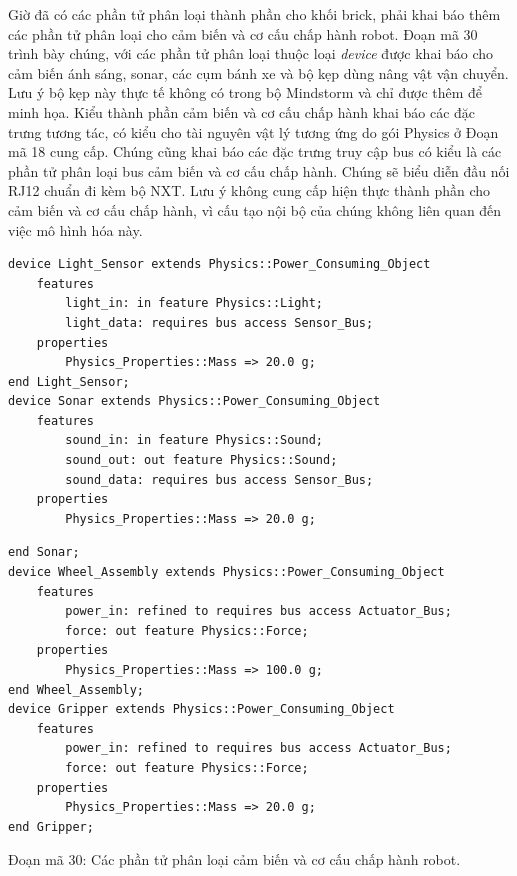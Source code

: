 Giờ đã có các phần tử phân loại thành phần cho khối brick, phải khai báo thêm các phần tử phân loại cho cảm biến và cơ cấu chấp hành robot. Đoạn mã 30 trình bày chúng, với các phần tử phân loại thuộc loại \emph{device} được khai báo cho cảm biến ánh sáng, sonar, các cụm bánh xe và bộ kẹp dùng nâng vật vận chuyển. Lưu ý bộ kẹp này thực tế không có trong bộ Mindstorm và chỉ được thêm để minh họa. Kiểu thành phần cảm biến và cơ cấu chấp hành khai báo các đặc trưng tương tác, có kiểu cho tài nguyên vật lý tương ứng do gói Physics ở Đoạn mã 18 cung cấp. Chúng cũng khai báo các đặc trưng truy cập bus có kiểu là các phần tử phân loại bus cảm biến và cơ cấu chấp hành. Chúng sẽ biểu diễn đầu nối RJ12 chuẩn đi kèm bộ NXT. Lưu ý không cung cấp hiện thực thành phần cho cảm biến và cơ cấu chấp hành, vì cấu tạo nội bộ của chúng không liên quan đến việc mô hình hóa này.
\begin{verbatim}
device Light_Sensor extends Physics::Power_Consuming_Object
    features
        light_in: in feature Physics::Light;
        light_data: requires bus access Sensor_Bus;
    properties
        Physics_Properties::Mass => 20.0 g;
end Light_Sensor;
device Sonar extends Physics::Power_Consuming_Object
    features
        sound_in: in feature Physics::Sound;
        sound_out: out feature Physics::Sound;
        sound_data: requires bus access Sensor_Bus;
    properties
        Physics_Properties::Mass => 20.0 g;
\end{verbatim}
\begin{verbatim}
end Sonar;
device Wheel_Assembly extends Physics::Power_Consuming_Object
    features
        power_in: refined to requires bus access Actuator_Bus;
        force: out feature Physics::Force;
    properties
        Physics_Properties::Mass => 100.0 g;
end Wheel_Assembly;
device Gripper extends Physics::Power_Consuming_Object
    features
        power_in: refined to requires bus access Actuator_Bus;
        force: out feature Physics::Force;
    properties
        Physics_Properties::Mass => 20.0 g;
end Gripper;
\end{verbatim}
\begin{center}\small Đoạn mã 30: Các phần tử phân loại cảm biến và cơ cấu chấp hành robot.\end{center}

